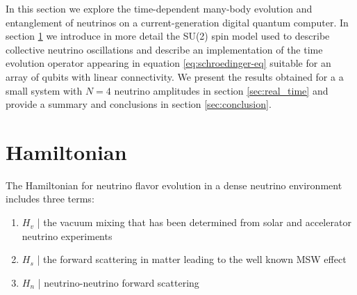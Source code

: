 \documentclass[Dual]{msu-thesis}
\begin{document}
In this section we explore the time-dependent many-body evolution and entanglement of neutrinos on a current-generation digital quantum computer. In section \ref{sec:spin_model} we introduce in more detail the SU(2) spin model used to describe collective neutrino oscillations and describe an implementation of the time evolution operator appearing in equation \eqref{eq:schroedinger-eq} suitable for an array of qubits with linear connectivity. We present the results obtained for a a small system with $N=4$ neutrino amplitudes in section \ref{sec:real_time} and provide a summary and conclusions in section \ref{sec:conclusion}.

\section{Hamiltonian}
\label{sec:spin_model}

The Hamiltonian for neutrino flavor evolution in a dense neutrino environment includes three terms: 
\begin{enumerate}
    \item $H_v$ | the vacuum mixing that has been determined from solar and accelerator neutrino experiments~\cite{GonzalezGarcia:2003}
    \item $H_s$ | the forward scattering in matter leading to the well known MSW effect~\cite{Wolfenstein:1977ue,Mikheev:1986gs}
    \item $H_n$ | neutrino-neutrino forward scattering
\end{enumerate}
\end{document}
